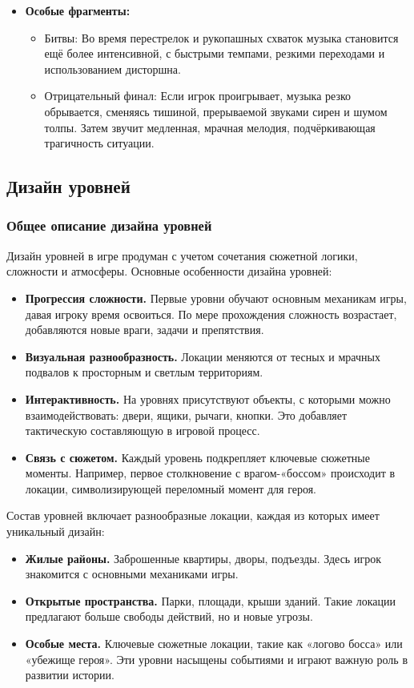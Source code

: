 \documentclass[12pt]{article}
\begin{document}
    \begin{itemize}
        \item \textbf {Особые фрагменты:}
        \begin{itemize}
            \item Битвы:  Во время перестрелок и рукопашных схваток музыка становится ещё более интенсивной, с быстрыми темпами, резкими переходами и использованием дисторшна.
            \item Отрицательный финал:  Если игрок проигрывает,  музыка резко обрывается, сменяясь  тишиной, прерываемой  звуками  сирен и  шумом толпы.  Затем  звучит  медленная, мрачная мелодия,  подчёркивающая  трагичность  ситуации.
        \end{itemize}
    \end{itemize}
    \subsection{Дизайн уровней}
    
        \subsubsection{Общее описание дизайна уровней}
        Дизайн уровней в игре продуман с учетом сочетания сюжетной логики, сложности и атмосферы.
        Основные особенности дизайна уровней:  
        \begin{itemize}
            \item \textbf{Прогрессия сложности.} Первые уровни обучают основным механикам игры, давая игроку время освоиться. По мере прохождения сложность возрастает, добавляются новые враги, задачи и препятствия.  
            \item \textbf{Визуальная разнообразность.} Локации меняются от тесных и мрачных подвалов к просторным и светлым территориям.  
            \item \textbf{Интерактивность.} На уровнях присутствуют объекты, с которыми можно взаимодействовать: двери, ящики, рычаги, кнопки. Это добавляет тактическую составляющую в игровой процесс.  
            \item \textbf{Связь с сюжетом.} Каждый уровень подкрепляет ключевые сюжетные моменты. Например, первое столкновение с врагом-«боссом» происходит в локации, символизирующей переломный момент для героя.  
        \end{itemize}
        
        Состав уровней включает разнообразные локации, каждая из которых имеет уникальный дизайн:  
        \begin{itemize}
            \item \textbf{Жилые районы.} Заброшенные квартиры, дворы, подъезды. Здесь игрок знакомится с основными механиками игры.  
            \item \textbf{Открытые пространства.} Парки, площади, крыши зданий. Такие локации предлагают больше свободы действий, но и новые угрозы.  
            \item \textbf{Особые места.} Ключевые сюжетные локации, такие как «логово босса» или «убежище героя». Эти уровни насыщены событиями и играют важную роль в развитии истории.  
        \end{itemize}
        
\end{document}
